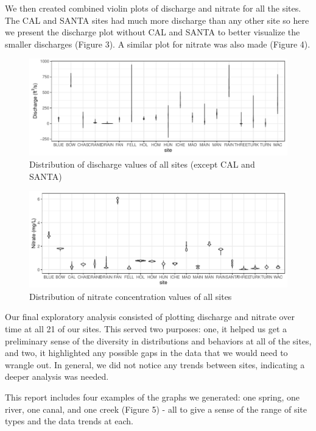 \documentclass[12pt,]{article}
\begin{document}
We then created combined violin plots of discharge and nitrate for all
the sites. The CAL and SANTA sites had much more discharge than any
other site so here we present the discharge plot without CAL and SANTA
to better visualize the smaller discharges (Figure 3). A similar plot
for nitrate was also made (Figure 4).

\begin{figure}
\centering
\includegraphics{Final-Project-Report_files/figure-latex/unnamed-chunk-5-1.pdf}
\caption{Distribution of discharge values of all sites (except CAL and
SANTA)}
\end{figure}

\begin{figure}
\centering
\includegraphics{Final-Project-Report_files/figure-latex/unnamed-chunk-6-1.pdf}
\caption{Distribution of nitrate concentration values of all sites}
\end{figure}

Our final exploratory analysis consisted of plotting discharge and
nitrate over time at all 21 of our sites. This served two purposes: one,
it helped us get a preliminary sense of the diversity in distributions
and behaviors at all of the sites, and two, it highlighted any possible
gaps in the data that we would need to wrangle out. In general, we did
not notice any trends between sites, indicating a deeper analysis was
needed.

This report includes four examples of the graphs we generated: one
spring, one river, one canal, and one creek (Figure 5) - all to give a
sense of the range of site types and the data trends at each.
\end{document}
